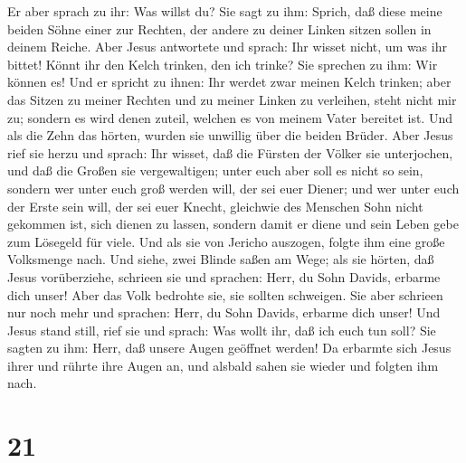  Er aber sprach zu ihr: Was willst du? Sie sagt zu ihm:
Sprich, daß diese meine beiden Söhne einer zur Rechten, der andere zu
deiner Linken sitzen sollen in deinem Reiche.  Aber Jesus
antwortete und sprach: Ihr wisset nicht, um was ihr bittet! Könnt ihr
den Kelch trinken, den ich trinke? Sie sprechen zu ihm: Wir können es!
 Und er spricht zu ihnen: Ihr werdet zwar meinen Kelch
trinken; aber das Sitzen zu meiner Rechten und zu meiner Linken zu
verleihen, steht nicht mir zu; sondern es wird denen zuteil, welchen es
von meinem Vater bereitet ist.  Und als die Zehn das
hörten, wurden sie unwillig über die beiden Brüder.  Aber
Jesus rief sie herzu und sprach: Ihr wisset, daß die Fürsten der Völker
sie unterjochen, und daß die Großen sie vergewaltigen; 
unter euch aber soll es nicht so sein, sondern wer unter euch groß
werden will, der sei euer Diener;  und wer unter euch der
Erste sein will, der sei euer Knecht,  gleichwie des
Menschen Sohn nicht gekommen ist, sich dienen zu lassen, sondern damit
er diene und sein Leben gebe zum Lösegeld für viele.  Und
als sie von Jericho auszogen, folgte ihm eine große Volksmenge nach.
 Und siehe, zwei Blinde saßen am Wege; als sie hörten,
daß Jesus vorüberziehe, schrieen sie und sprachen: Herr, du Sohn Davids,
erbarme dich unser!  Aber das Volk bedrohte sie, sie
sollten schweigen. Sie aber schrieen nur noch mehr und sprachen: Herr,
du Sohn Davids, erbarme dich unser!  Und Jesus stand
still, rief sie und sprach: Was wollt ihr, daß ich euch tun soll?
 Sie sagten zu ihm: Herr, daß unsere Augen geöffnet
werden!  Da erbarmte sich Jesus ihrer und rührte ihre
Augen an, und alsbald sahen sie wieder und folgten ihm nach.

\hypertarget{section-20}{%
\section{21}\label{section-20}}

